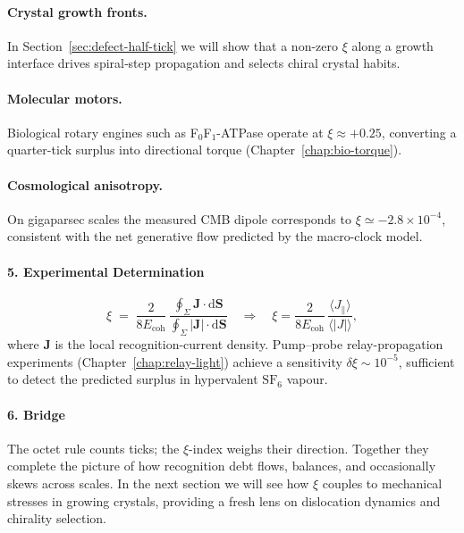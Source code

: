 \documentclass[11pt,oneside]{book}
\begin{document}
\paragraph{Crystal growth fronts.}
In Section~\ref{sec:defect-half-tick} we will show that a non-zero
\(\xi\) along a growth interface drives spiral‐step propagation and
selects chiral crystal habits.

\paragraph{Molecular motors.}
Biological rotary engines such as F\(_0\)F\(_1\)-ATPase operate at
\(\xi\approx+0.25\), converting a quarter-tick surplus into directional
torque (Chapter~\ref{chap:bio-torque}).

\paragraph{Cosmological anisotropy.}
On gigaparsec scales the measured CMB dipole corresponds to
\(\xi \simeq -2.8\times10^{-4}\), consistent with the net generative flow
predicted by the macro-clock model.

\paragraph*{5. Experimental Determination}

\[
   \xi
   \;=\;
   \frac{2}{8E_{\text{coh}}}\,
   \frac{ \oint_\Sigma \mathbf J\!\cdot\!\mathrm d\mathbf S }
        { \oint_\Sigma \bigl|\mathbf J\bigr|\!\cdot\!\mathrm d\mathbf S }
   \quad\Longrightarrow\quad
   \xi = \frac{2}{8E_{\text{coh}}}\,
         \frac{\langle J_\parallel \rangle}{\langle |J| \rangle},
\]
where \(\mathbf J\) is the local recognition-current density.
Pump–probe relay-propagation experiments (Chapter~\ref{chap:relay-light})
achieve a sensitivity \(\delta\xi\sim10^{-5}\), sufficient to detect the
predicted surplus in hypervalent \(\mathrm{SF_6}\) vapour.

\paragraph*{6. Bridge}

The octet rule counts ticks; the \(\xi\)-index weighs their direction.
Together they complete the picture of how recognition debt
flows, balances, and occasionally skews across scales.
In the next section we will see how \(\xi\) couples to mechanical
stresses in growing crystals, providing a fresh lens on dislocation
dynamics and chirality selection.
\end{document}
